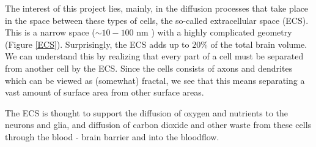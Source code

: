 The interest of this project lies, mainly, in the diffusion processes that take place in the space between these types of cells, the so-called extracellular space (ECS). 
This is a narrow space ($\sim 10-100$ nm \cite{nicholson2001diffusion}) with a highly complicated geometry (Figure \ref{ECS}). 
Surprisingly, the ECS adds up to $20\%$ of the total brain volume. 
We can understand this by realizing that every part of a cell must be separated from another cell by the ECS. 
Since the cells consists of axons and dendrites which can be viewed as (somewhat) fractal, we see that this means separating a vast amount of surface area from other surface areas.

The ECS is thought to support the diffusion of oxygen and nutrients to the neurons and glia, and diffusion of carbon dioxide and other waste from these cells through the blood - brain barrier and into the bloodflow. 



